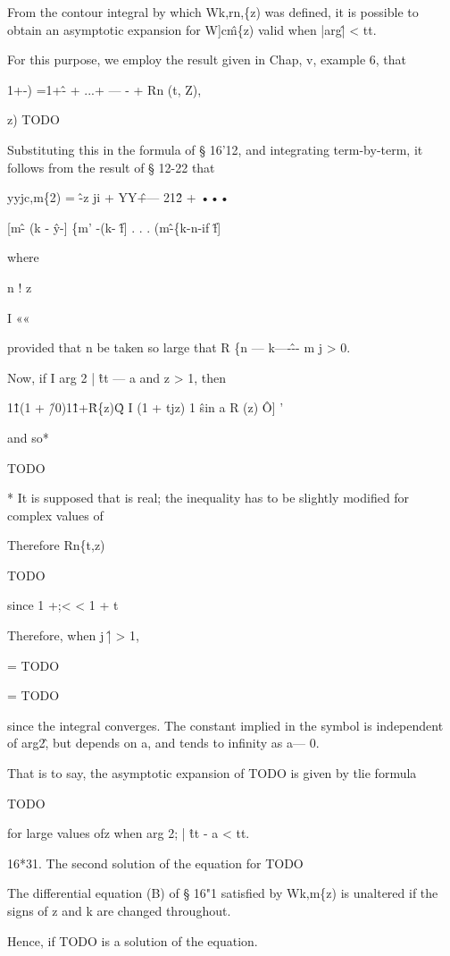 From the contour integral by which Wk,rn,\{z) was defined, it is
possible to obtain an asymptotic expansion for W]c\^m\{z) valid when
|arg\^| < tt.

For this purpose, we employ the result given in Chap, v, example 6,
that

1+-) =1+\^- + ...+ — - + Rn (t, Z),

z) TODO

Substituting this in the formula of § 16'12, and integrating
term-by-term, it follows from the result of § 12-22 that

yyjc,m\{2) = \^ -z ji + YY\^ +— 21\^2 + •••

[m\^ - (k - \^y-] \{m' -(k- \^f] . . . (m\^ -\{k-n-if \^f]

where

n ! z

I ««

provided that n be taken so large that R \{n — k—-\^-- m j > 0.

Now, if I arg 2 | \^ tt — a and z > 1, then

1\^1(1 + \^/0)1\^1+\^ R\{z)\^Q I (1 + tjz) 1 \^ sin a R (z) \^ O] '

and so*

TODO

* It is supposed that is real; the inequality has to be slightly
modified for complex values of

%
%

Therefore Rn\{t,z)

TODO

since 1 +;< < 1 + t

Therefore, when j \^ | > 1,

= TODO

= TODO

since the integral converges. The constant implied in the symbol is
independent of arg2\^, but depends on a, and tends to infinity as a—
0.

That is to say, the asymptotic expansion of TODO is given by tlie
formula

TODO

for large values ofz when arg 2; | \^ tt - a < tt.

16*31. The second solution of the equation for TODO

The differential equation (B) of § 16"1 satisfied by Wk,m\{z) is
unaltered if the signs of z and k are changed throughout.

Hence, if TODO is a solution of the equation.

